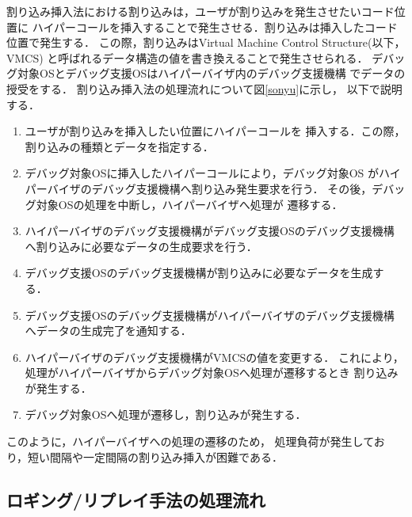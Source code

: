 \documentclass[submit,techreq,noauthor,dvipdfmx]{ipsj}
\begin{document}

割り込み挿入法における割り込みは，ユーザが割り込みを発生させたいコード位置に
ハイパーコールを挿入することで発生させる．割り込みは挿入したコード位置で発生する．
この際，割り込みはVirtual Machine Control Structure(以下，VMCS)
と呼ばれるデータ構造の値を書き換えることで発生させられる．
デバッグ対象OSとデバッグ支援OSはハイパーバイザ内のデバッグ支援機構
でデータの授受をする．
割り込み挿入法の処理流れについて図\ref{sonyu}に示し，
以下で説明する．
\begin{enumerate}
    \item
        ユーザが割り込みを挿入したい位置にハイパーコールを
        挿入する．この際，割り込みの種類とデータを指定する．
    \item 
        デバッグ対象OSに挿入したハイパーコールにより，デバッグ対象OS
        がハイパーバイザのデバッグ支援機構へ割り込み発生要求を行う．
        その後，デバッグ対象OSの処理を中断し，ハイパーバイザへ処理が
        遷移する．
    \item 
        ハイパーバイザのデバッグ支援機構がデバッグ支援OSのデバッグ支援機構
        へ割り込みに必要なデータの生成要求を行う．
    \item 
        デバッグ支援OSのデバッグ支援機構が割り込みに必要なデータを生成する．
    \item 
        デバッグ支援OSのデバッグ支援機構がハイパーバイザのデバッグ支援機構
        へデータの生成完了を通知する．
    \item 
        ハイパーバイザのデバッグ支援機構がVMCSの値を変更する．
        これにより，処理がハイパーバイザからデバッグ対象OSへ処理が遷移するとき
        割り込みが発生する．
    \item 
        デバッグ対象OSへ処理が遷移し，割り込みが発生する．
\end{enumerate}

このように，ハイパーバイザへの処理の遷移のため，
処理負荷が発生しており，短い間隔や一定間隔の割り込み挿入が困難である．

\subsection{ロギング/リプレイ手法の処理流れ}\label{sec:processing_flow_rogging/replay_method}

\end{document}
